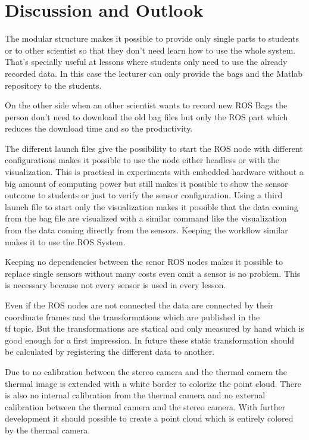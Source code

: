 \chapter{Discussion and Outlook}\label{ch:discussionAndOutlook}

The modular structure makes it possible to provide only single parts to students or to other scientist so that they don't need learn how to use the whole system.
That's specially useful at lessons where students only need to use the already recorded data.
In this case the lecturer can only provide the bags and the Matlab repository to the students.

On the other side when an other scientist wants to record new ROS Bags the person don't need to download the old bag files but only the ROS part which reduces the download time and so the productivity. 

The different launch files give the possibility to start the ROS node with different configurations makes it possible to use the node either headless or with the visualization.
This is practical in experiments with embedded hardware without a big amount of computing power but still makes it possible to show the sensor outcome to students or just to verify the sensor configuration.
Using a third launch file to start only the visualization makes it possible that the data coming from the bag file are visualized with a similar command like the visualization from the data coming directly from the sensors.
Keeping the workflow similar makes it to use the ROS System.

Keeping no dependencies between the senor ROS nodes makes it possible to replace single sensors without many costs even omit a sensor is no problem.
This is necessary because not every sensor is used in every lesson.

Even if the ROS nodes are not connected the data are connected by their coordinate frames and the transformations which are published in the \\tf topic.
But the transformations are statical and only measured by hand which is good enough for a first impression.
In future these static transformation should be calculated by registering the different data to another.

Due to no calibration between the stereo camera and the thermal camera the thermal image is extended with a white border to colorize the point cloud.
There is also no internal calibration from the thermal camera and no external calibration between the thermal camera and the stereo camera.
With further development it should possible to create a point cloud which is entirely colored by the thermal camera.

